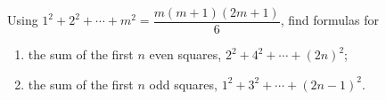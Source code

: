 Using $1^2+2^2+\cdots+m^2=\dfrac{m(m+1)(2m+1)}{6}$, find formulas for
\begin{enumerate}
\item[(a)] the sum of the first $n$ even squares, $2^2+4^2+\cdots+(2n)^2$;
\item[(b)] the sum of the first $n$ odd squares, $1^2+3^2+\cdots+(2n-1)^2$.
\end{enumerate}
